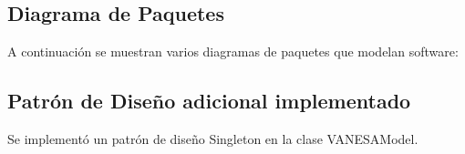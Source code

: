 \documentclass[10pt]{article} %
\begin{document}

\subsection{Diagrama de Paquetes}
A continuación se muestran varios diagramas de paquetes que modelan software:

\begin{figure}[H] %
\label{fig:DiagramaDePaquetes_Post_a}
\end{figure}

\begin{figure}[H] %
\label{fig:DiagramaDePaquetes_Post_b}
\end{figure}

\begin{figure}[H] %
\label{fig:DiagramaDePaquetes_Post_c}
\end{figure}

\subsection{Patrón de Diseño adicional implementado}
Se implementó un patrón de diseño Singleton en la clase VANESAModel.
\end{document}
